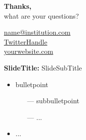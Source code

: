 \documentclass{beamer} %
\begin{document}
{
    \begin{frame}[plain]		
    	\vspace{1.5cm}
    	{\color{white}\LARGE \textbf{Thanks,}\\ \vspace{.2cm} \large what are your questions?}
    		
    	\vspace{2.5cm}
    	
    	\hspace{7cm}\circled{{\color{ifo-blue}\fontsize{8}{9}\faEnvelope}} \hspace{.1cm} {\footnotesize \color{white} \href{mailto:#}{name@institution.com}}\\ %
    	\hspace{7cm}\circled{{\color{ifo-blue}\footnotesize\faTwitter}} \hspace{.1cm} {\footnotesize \color{white} \href{#}{TwitterHandle}}\\ %
    	\hspace{7cm}\circled{{\color{ifo-blue}\footnotesize\faHome}} \hspace{.1cm} {\footnotesize \color{white} \href{#}{yourwebsite.com}}\\ %
    \end{frame}
    \addtocounter{framenumber}{-1}
}

\appendix
\backupbegin
\renewcommand{\theframenumber}{\Roman{framenumber}}

\begin{frame}[label=appendix]{\textbf{SlideTitle:} SlideSubTitle}
	\begin{itemize}
	    \item bulletpoint
    	\begin{itemize}
    	    \item[---] subbulletpoint
    	    \item[---] ...
    	\end{itemize}
    	\item ...
	\end{itemize}
	\hspace{\fill}\hyperlink{descr}{}
\end{frame}

\backupend
\end{document}
